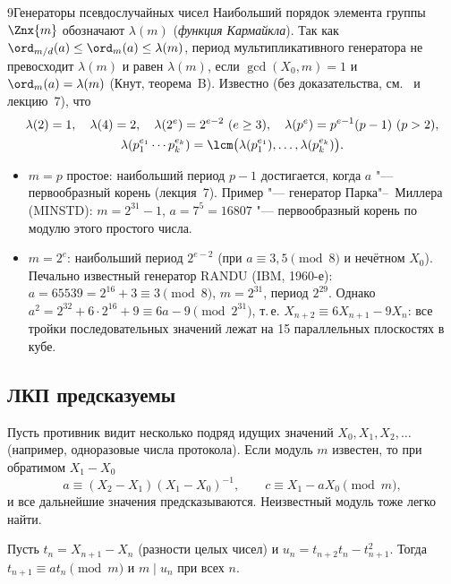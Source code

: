 \begin{lecture}{9}{Генераторы псевдослучайных чисел}
Наибольший порядок элемента группы $\Znx{m}$ обозначают $\lambda(m)$ (\emph{функция Кармайкла}).
Так как $\ord_{m/d}(a) \le \ord_m(a) \le \lambda(m)$, период мультипликативного генератора не
превосходит $\lambda(m)$ и равен $\lambda(m)$, если $\gcd(X_0, m) = 1$ и $\ord_m(a) = \lambda(m)$
(Кнут, теорема~B). Известно (без доказательства, см.~\cite[разд.~3.2.1.2]{knuth-taocp2} и
лекцию~7), что
\[
\begin{gathered}
  \lambda(2) = 1,\quad \lambda(4) = 2,\quad \lambda(2^e) = 2^{e-2}\ (e \ge 3),\quad
  \lambda(p^e) = p^{e-1}(p - 1)\ (p > 2),\\
  \lambda(p_1^{e_1} \cdots p_k^{e_k}) = \lcm\bigl(\lambda(p_1^{e_1}), \dots, \lambda(p_k^{e_k})\bigr).
\end{gathered}
\]
\begin{itemize}
  \item $m = p$ простое: наибольший период $p - 1$ достигается, когда $a$ "--- первообразный
    корень (лекция~7). Пример "--- генератор Парка"--~Миллера (MINSTD): $m = 2^{31} - 1$,
    $a = 7^5 = 16807$ "--- первообразный корень по модулю этого простого числа.
  \item $m = 2^e$: наибольший период $2^{e-2}$ (при $a \equiv 3, 5 \pmod 8$ и нечётном $X_0$).
    Печально известный генератор RANDU (IBM, 1960-е): $a = 65539 = 2^{16} + 3 \equiv 3 \pmod 8$,
    $m = 2^{31}$, период $2^{29}$. Однако $a^2 = 2^{32} + 6 \cdot 2^{16} + 9 \equiv 6a - 9
    \pmod{2^{31}}$, т.\,е. $X_{n+2} \equiv 6 X_{n+1} - 9 X_n$: все тройки последовательных
    значений лежат на 15 параллельных плоскостях в кубе.
\end{itemize}


\subsection{ЛКП предсказуемы}

Пусть противник видит несколько подряд идущих значений $X_0, X_1, X_2, \dots$ (например,
одноразовые числа протокола). Если модуль $m$ известен, то при обратимом $X_1 - X_0$
\[
  a \equiv (X_2 - X_1)(X_1 - X_0)^{-1}, \qquad c \equiv X_1 - a X_0 \pmod m,
\]
и все дальнейшие значения предсказываются. Неизвестный модуль тоже легко найти.

\begin{proposition}\label{l9:lcg-attack}
Пусть $t_n = X_{n+1} - X_n$ (разности целых чисел) и $u_n = t_{n+2} t_n - t_{n+1}^2$. Тогда
$t_{n+1} \equiv a t_n \pmod m$ и $m \mid u_n$ при всех $n$.
\end{proposition}


\end{lecture}
